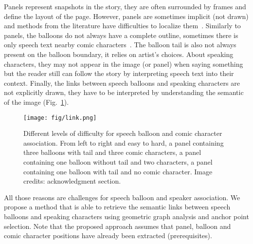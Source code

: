 \documentclass[conference]{IEEEtran}
\begin{document}
Panels represent snapshots in the story, they are often surrounded by frames and define the layout of the page.
However, panels are sometimes implicit (not drawn) and methods from the literature have difficulties to localize them~\cite{Rigaud2012LNCS,Pang2014Robust}.
Similarly to panels, the balloons do not always have a complete outline, sometimes there is only speech text nearby comic characters~\cite{rigaud2013active}.
The balloon tail is also not always present on the balloon boundary, it relies on artist's choices.
About speaking characters, they may not appear in the image (or panel) when saying something but the reader still can follow the story by interpreting speech text into their context.
Finally, the links between speech balloons and speaking characters are not explicitly drawn, they have to be interpreted by understanding the semantic of the image (Fig.~\ref{fig:links}).
 \begin{figure}[t]  %
   \centering
  \texttt{[image: fig/link.png]}
  \caption{Different levels of difficulty for speech balloon and comic character association. From left to right and easy to hard, a panel containing three balloons with tail and three comic characters, a panel containing one balloon without tail and two characters, a panel containing one balloon with tail and no comic character. Image credits: acknowledgment section.}
  \label{fig:links}
 \end{figure}
All those reasons are challenges for speech balloon and speaker association.
We propose a method that is able to retrieve the semantic links between speech balloons and speaking characters using geometric graph analysis and anchor point selection.
Note that the proposed approach assumes that panel, balloon and comic character positions have already been extracted (prerequisites).%
\end{document}
